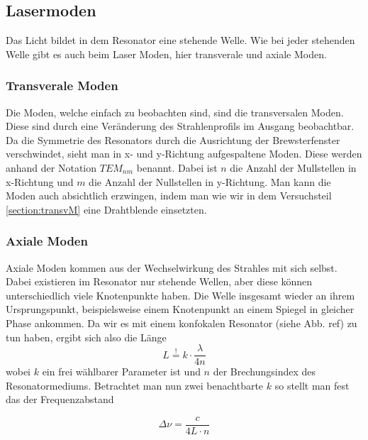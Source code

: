 
\subsection{Lasermoden}

Das Licht bildet in dem Resonator eine stehende Welle. Wie bei jeder stehenden Welle gibt es 
auch beim Laser Moden, hier transverale und axiale Moden.

\subsubsection{Transverale Moden}

Die Moden, welche einfach zu beobachten sind, sind die transversalen Moden. Diese sind durch eine Veränderung des
Strahlenprofils im Ausgang beobachtbar. Da die Symmetrie des Resonators durch die 
Ausrichtung der Brewsterfenster verschwindet, sieht man in x- und y-Richtung aufgespaltene Moden. Diese werden anhand der Notation $TEM_{nm}$ benannt.
Dabei ist $n$ die Anzahl der Mullstellen in x-Richtung und $m$ die Anzahl der Nullstellen in y-Richtung. Man kann die Moden auch
absichtlich erzwingen, indem man wie wir in dem Versuchsteil \ref{section:transvM} eine Drahtblende einsetzten.


\subsubsection{Axiale Moden}

Axiale Moden kommen aus der Wechselwirkung des Strahles mit sich selbst.
Dabei existieren im Resonator nur stehende Wellen, aber diese können unterschiedlich viele Knotenpunkte haben.
Die Welle insgesamt wieder an ihrem Ursprungspunkt, beispielsweise einem Knotenpunkt an einem Spiegel in gleicher Phase ankommen. Da wir es mit einem konfokalen Resonator (siehe Abb. ref) zu tun haben,
ergibt sich also die Länge 
\begin{equation}
    L \overset{!}{=} k \cdot \frac{\lambda}{4n} 
\end{equation}
wobei $k$ ein frei wählbarer Parameter ist und $n$ der Brechungsindex des Resonatormediums.
Betrachtet man nun zwei benachtbarte $k$ so stellt man fest das der Frequenzabstand 

\begin{equation}
    \Delta \nu = \frac{c}{4L\cdot n}
    \label{eq:FSR}
\end{equation}


